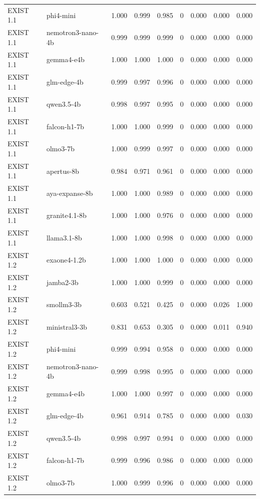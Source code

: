 \begin{table}[t]
\begin{tabular}{llrrrrrrr}
EXIST 1.1 & phi4-mini & 1.000 & 0.999 & 0.985 & 0 & 0.000 & 0.000 & 0.000 \\
EXIST 1.1 & nemotron3-nano-4b & 0.999 & 0.999 & 0.999 & 0 & 0.000 & 0.000 & 0.000 \\
EXIST 1.1 & gemma4-e4b & 1.000 & 1.000 & 1.000 & 0 & 0.000 & 0.000 & 0.000 \\
EXIST 1.1 & glm-edge-4b & 0.999 & 0.997 & 0.996 & 0 & 0.000 & 0.000 & 0.000 \\
EXIST 1.1 & qwen3.5-4b & 0.998 & 0.997 & 0.995 & 0 & 0.000 & 0.000 & 0.000 \\
EXIST 1.1 & falcon-h1-7b & 1.000 & 1.000 & 0.999 & 0 & 0.000 & 0.000 & 0.000 \\
EXIST 1.1 & olmo3-7b & 1.000 & 0.999 & 0.997 & 0 & 0.000 & 0.000 & 0.000 \\
EXIST 1.1 & apertus-8b & 0.984 & 0.971 & 0.961 & 0 & 0.000 & 0.000 & 0.000 \\
EXIST 1.1 & aya-expanse-8b & 1.000 & 1.000 & 0.989 & 0 & 0.000 & 0.000 & 0.000 \\
EXIST 1.1 & granite4.1-8b & 1.000 & 1.000 & 0.976 & 0 & 0.000 & 0.000 & 0.000 \\
EXIST 1.1 & llama3.1-8b & 1.000 & 1.000 & 0.998 & 0 & 0.000 & 0.000 & 0.000 \\
EXIST 1.2 & exaone4-1.2b & 1.000 & 1.000 & 1.000 & 0 & 0.000 & 0.000 & 0.000 \\
EXIST 1.2 & jamba2-3b & 1.000 & 1.000 & 0.999 & 0 & 0.000 & 0.000 & 0.000 \\
EXIST 1.2 & smollm3-3b & 0.603 & 0.521 & 0.425 & 0 & 0.000 & 0.026 & 1.000 \\
EXIST 1.2 & ministral3-3b & 0.831 & 0.653 & 0.305 & 0 & 0.000 & 0.011 & 0.940 \\
EXIST 1.2 & phi4-mini & 0.999 & 0.994 & 0.958 & 0 & 0.000 & 0.000 & 0.000 \\
EXIST 1.2 & nemotron3-nano-4b & 0.999 & 0.998 & 0.995 & 0 & 0.000 & 0.000 & 0.000 \\
EXIST 1.2 & gemma4-e4b & 1.000 & 1.000 & 0.997 & 0 & 0.000 & 0.000 & 0.000 \\
EXIST 1.2 & glm-edge-4b & 0.961 & 0.914 & 0.785 & 0 & 0.000 & 0.000 & 0.030 \\
EXIST 1.2 & qwen3.5-4b & 0.998 & 0.997 & 0.994 & 0 & 0.000 & 0.000 & 0.000 \\
EXIST 1.2 & falcon-h1-7b & 0.999 & 0.996 & 0.986 & 0 & 0.000 & 0.000 & 0.000 \\
EXIST 1.2 & olmo3-7b & 1.000 & 0.999 & 0.996 & 0 & 0.000 & 0.000 & 0.000 \\

\end{tabular}
\end{table}
